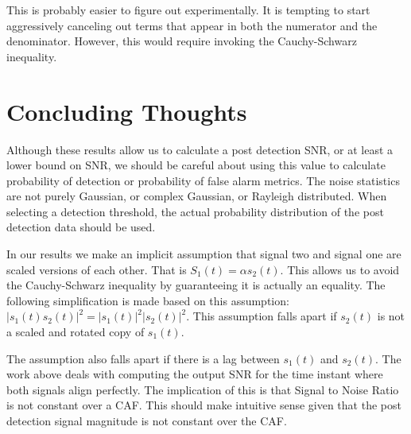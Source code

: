 \documentclass[11pt]{article}
\begin{document}







This is probably easier to figure out experimentally. It is tempting to start aggressively canceling out terms that appear in both the numerator and the denominator. However, this would require invoking the Cauchy-Schwarz inequality.


\section{Concluding Thoughts}

Although these results allow us to calculate a post detection SNR, or at least a lower bound on SNR, we should be careful about using this value to calculate probability of detection or probability of false alarm metrics. The noise statistics are not purely Gaussian, or complex Gaussian, or Rayleigh distributed. When selecting a detection threshold, the actual probability distribution of the post detection data should be used.

In our results we make an implicit assumption that signal two and signal one are scaled versions of each other. That is $S_1(t) = \alpha s_2(t)$. This allows us to avoid the Cauchy-Schwarz inequality by guaranteeing it is actually an equality. The following simplification is made based on this assumption: $|s_1(t)s_2(t)|^2 = |s_1(t)|^2|s_2(t)|^2$. This assumption falls apart if $s_2(t)$ is not a scaled and rotated copy of $s_1(t)$.

The assumption also falls apart if there is a lag between $s_1(t)$ and $s_2(t)$. The work above deals with computing the output SNR for the time instant where both signals align perfectly. The implication of this is that Signal to Noise Ratio is not constant over a CAF. This should make intuitive sense given that the post detection signal magnitude is not constant over the CAF.

\end{document}
